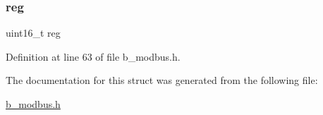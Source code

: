 \subsubsection{\texorpdfstring{reg}{reg}}
{\footnotesize\ttfamily uint16\+\_\+t reg}



Definition at line 63 of file b\+\_\+modbus.\+h.



The documentation for this struct was generated from the following file\+:\begin{DoxyCompactItemize}
\item 
\mbox{\hyperlink{b__modbus_8h}{b\+\_\+modbus.\+h}}\end{DoxyCompactItemize}
